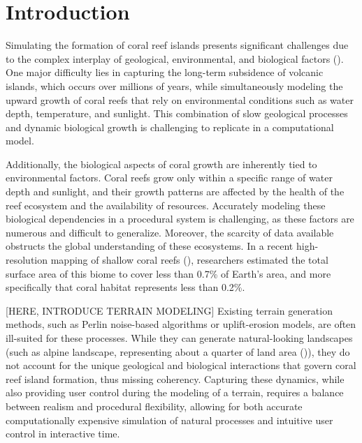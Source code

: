 \section{Introduction}

Simulating the formation of coral reef islands presents significant challenges due to the complex interplay of geological, environmental, and biological factors (\cite{Hopley2014}). One major difficulty lies in capturing the long-term subsidence of volcanic islands, which occurs over millions of years, while simultaneously modeling the upward growth of coral reefs that rely on environmental conditions such as water depth, temperature, and sunlight. This combination of slow geological processes and dynamic biological growth is challenging to replicate in a computational model.

Additionally, the biological aspects of coral growth are inherently tied to environmental factors. Coral reefs grow only within a specific range of water depth and sunlight, and their growth patterns are affected by the health of the reef ecosystem and the availability of resources. Accurately modeling these biological dependencies in a procedural system is challenging, as these factors are numerous and difficult to generalize. Moreover, the scarcity of data available obstructs the global understanding of these ecosystems. In a recent high-resolution mapping of shallow coral reefs (\cite{Lyons2024}), researchers estimated the total surface area of this biome to cover less than 0.7\% of Earth's area, and more specifically that coral habitat represents less than 0.2\%. 

[HERE, INTRODUCE TERRAIN MODELING] Existing terrain generation methods, such as Perlin noise-based algorithms or uplift-erosion models, are often ill-suited for these processes. While they can generate natural-looking landscapes (such as alpine landscape, representing about a quarter of land area (\cite{Korner2014})), they do not account for the unique geological and biological interactions that govern coral reef island formation, thus missing coherency. Capturing these dynamics, while also providing user control during the modeling of a terrain, requires a balance between realism and procedural flexibility, allowing for both accurate computationally expensive simulation of natural processes and intuitive user control in interactive time.


